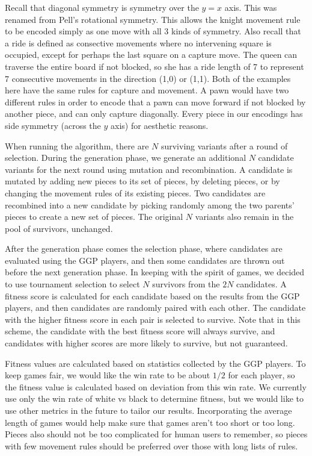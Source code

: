 \documentclass[11pt,letterpaper]{article}
\begin{document}
Recall that diagonal symmetry is symmetry over the $y=x$ axis. This was renamed from Pell's rotational symmetry. This allows the knight movement rule to be encoded simply as one move with all 3 kinds of symmetry. Also recall that a ride is defined as consective movements where no intervening square is occupied, except for perhaps the last square on a capture move. The queen can traverse the entire board if not blocked, so she has a ride length of 7 to represent 7 consecutive movements in the direction (1,0) or (1,1). Both of the examples here have the same rules for capture and movement. A pawn would have two different rules in order to encode that a pawn can move forward if not blocked by another piece, and can only capture diagonally. Every piece in our encodings has side symmetry (across the $y$ axis) for aesthetic reasons.

When running the algorithm, there are $N$ surviving variants after a round of selection. During the generation phase, we generate an additional $N$ candidate variants for the next round using mutation and recombination. A candidate is mutated by adding new pieces to its set of pieces, by deleting pieces, or by changing the movement rules of its existing pieces. Two candidates are recombined into a new candidate by picking randomly among the two parents' pieces to create a new set of pieces. The original $N$ variants also remain in the pool of survivors, unchanged.

After the generation phase comes the selection phase, where candidates are evaluated using the GGP players, and then some candidates are thrown out before the next generation phase. In keeping with the spirit of games, we decided to use tournament selection to select $N$ survivors from the $2N$ candidates. A fitness score is calculated for each candidate based on the results from the GGP players, and then candidates are randomly paired with each other. The candidate with the higher fitness score in each pair is selected to survive. Note that in this scheme, the candidate with the best fitness score will always survive, and candidates with higher scores are more likely to survive, but not guaranteed.

Fitness values are calculated based on statistics collected by the GGP players. To keep games fair, we would like the win rate to be about $1/2$ for each player, so the fitness value is calculated based on deviation from this win rate. We currently use only the win rate of white vs black to determine fitness, but we would like to use other metrics in the future to tailor our results. Incorporating the average length of games would help make sure that games aren't too short or too long. Pieces also should not be too complicated for human users to remember, so pieces with few movement rules should be preferred over those with long lists of rules.
\end{document}
